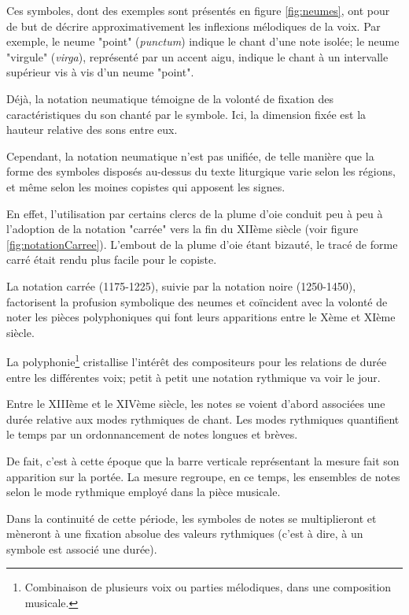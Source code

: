 Ces symboles, dont des exemples sont présentés en figure \ref{fig:neumes}, ont pour de but de décrire approximativement les inflexions mélodiques de la voix. Par exemple, le neume "point" (\textit{punctum}) indique le chant d'une note isolée; le neume "virgule" (\textit{virga}), représenté par un accent aigu, indique le chant à un intervalle supérieur vis à vis d'un neume "point".

Déjà, la notation neumatique témoigne de la volonté de fixation des caractéristiques du son chanté par le symbole. Ici, la dimension fixée est la hauteur relative des sons entre eux.

Cependant, la notation neumatique n'est pas unifiée, de telle manière que la forme des symboles disposés au-dessus du texte liturgique varie selon les régions, et même selon les moines copistes qui apposent les signes.

En effet, l'utilisation par certains clercs de la plume d'oie conduit peu à peu à l'adoption de la notation "carrée" vers la fin du XIIème siècle (voir figure \ref{fig:notationCarree}). L'embout de la plume d'oie étant bizauté, le tracé de forme carré était rendu plus facile pour le copiste.

La notation carrée (1175-1225), suivie par la notation noire (1250-1450), factorisent la profusion symbolique des neumes et coïncident avec la volonté de noter les pièces polyphoniques qui font leurs apparitions entre le Xème et XIème siècle.

La \gls{polyphonie}\footnote{Combinaison de plusieurs voix ou parties mélodiques, dans une composition musicale.} cristallise l'intérêt des compositeurs pour les relations de durée entre les différentes voix; petit à petit une notation rythmique va voir le jour.

Entre le XIIIème et le XIVème siècle, les notes se voient d'abord associées une durée relative aux modes rythmiques de chant. Les modes rythmiques quantifient le temps par un ordonnancement de notes longues et brèves.

De fait, c'est à cette époque que la barre verticale représentant la mesure fait son apparition sur la portée. La mesure regroupe, en ce temps, les ensembles de notes selon le mode rythmique employé dans la pièce musicale.

Dans la continuité de cette période, les symboles de notes se multiplieront et mèneront à une fixation absolue des valeurs rythmiques (c'est à dire, à un symbole est associé une durée).

